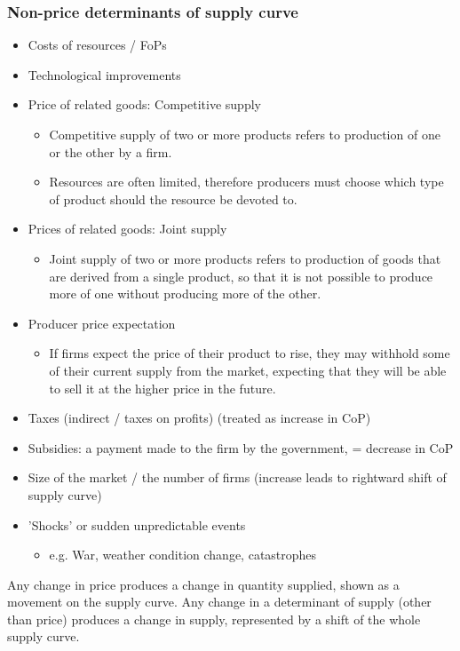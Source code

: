 \subsubsection*{Non-price determinants of supply curve}
\begin{itemize}
  \item Costs of resources / FoPs
  \item Technological improvements
  \item Price of related goods: Competitive supply
  \begin{itemize}
    \item Competitive supply of two or more products refers to production of one or the other by a firm.
    \item Resources are often limited, therefore producers must choose which type of product should the resource be devoted to.
  \end{itemize}
  \item Prices of related goods: Joint supply
  \begin{itemize}
    \item Joint supply of two or more products refers to production of goods that are derived from a single product, so that it is not possible to produce more of one without producing more of the other.
  \end{itemize}
  \item Producer price expectation
  \begin{itemize}
    \item If firms expect the price of their product to rise, they may withhold some of their current supply from the market, expecting that they will be able to sell it at the higher price in the future.
  \end{itemize}
  \item Taxes (indirect / taxes on profits) (treated as increase in CoP)
  \item Subsidies: a payment made to the firm by the government, = decrease in CoP
  \item Size of the market / the number of firms (increase leads to rightward shift of supply curve)
  \item 'Shocks' or sudden unpredictable events
  \begin{itemize}
    \item e.g. War, weather condition change, catastrophes
  \end{itemize}
\end{itemize}
Any change in price produces a change in quantity supplied, shown as a movement on the supply curve. Any change in a determinant of supply (other than price) produces a change in supply, represented by a shift of the whole supply curve.
